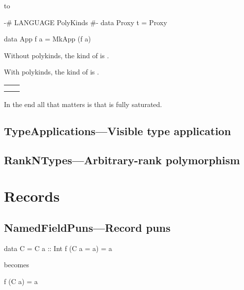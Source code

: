 \documentclass[openany, 12pt]{book}
\begin{document}
to
\begin{haskell}{}
{-# LANGUAGE PolyKinds #-}
data Proxy t = Proxy

\begin{haskell}{}
	data App f a = MkApp (f a)
\end{haskell}

Without polykinds, the kind of  is .

With polykinds, the kind of  is .

\begin{center}
	\begin{tabular}{ll}
		\toprule
		\hask{App}                                                & \hask{f}                      \\
		\midrule
		\hask{(Type -> Type) -> Type -> Type}                     & \hask{Type -> Type}           \\
		\hask{((Type -> Type) -> Type) -> (Type -> Type) -> Type} & \hask{(Type -> Type) -> Type} \\
		\bottomrule
	\end{tabular}
\end{center}

In the end all that matters is that  is fully saturated.

\setcounter{chapter}{16}
\chapter{TypeApplications---Visible type application}

\setcounter{chapter}{19}
\chapter{RankNTypes---Arbitrary-rank polymorphism}


\part{Records}

\setcounter{chapter}{6}
\chapter{NamedFieldPuns---Record puns}
\begin{haskell}{}
data C = C {a :: Int}
f (C {a = a}) = a
\end{haskell}
becomes

\begin{haskell}{}
f (C {a}) = a
\end{haskell}


\end{haskell}
\end{document}
